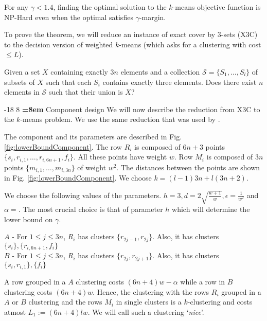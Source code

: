 \documentclass[orivec]{llncs}
\makeatletter
\newcommand{\mc}{\mathcal}
\renewcommand\subsubsection{\@startsection{subsubsection}{3}{\z@}%
   {-18\p@ \@plus -4\p@ \@minus -4\p@}%
   {8\p@ \@plus 4\p@ \@minus 4\p@}%
   {\normalfont\normalsize\bfseries\boldmath
   \rightskip=\z@ \@plus 8em \pretolerance=10000}}
\makeatother
\begin{document}
\begin{theorem}
For any $\gamma < 1.4$, finding the optimal solution to the $k$-means objective function is NP-Hard even when the optimal satisfies $\gamma$-margin.
\end{theorem}
To prove the theorem, we will reduce an instance of exact cover by 3-sets (X3C) to the decision version of weighted $k$-means (which asks for a clustering with cost $\le L$).
\begin{definition}[X3C]
Given a set $X$ containing exactly $3n$ elements and a collection $\mc S = \{S_1, \ldots, S_l\}$ of subsets of $X$ such that each $S_i$ contains exactly three elements. Does there exist $n$ elements in $\mc S$ such that their union is $X$? 
\end{definition}

\subsubsection{Component design}
We will now describe the reduction from X3C to the $k$-means problem. We use the same reduction that was used by \cite{vattani2009hardness}. 

The component and its parameters are described in Fig. \ref{fig:lowerBoundComponent}. The row $R_i$ is composed of $6n + 3$ points $\{s_i, r_{i, 1}, \ldots, r_{i, 6n+1}, f_i\}$. All these points have weight $w$. Row $M_i$ is composed of $3n$ points $\{m_{i,1}, \ldots, m_{i, 3n}\}$ of weight $w^2$. The distances between the points are shown in Fig. \ref{fig:lowerBoundComponent}. We choose $k = (l-1)3n + l(3n+2)$. 

We choose the following values of the parameters. $h = 3, d = 2\sqrt{\frac{w+1}{w}}, \epsilon = \frac{1}{w^2}$ and $\alpha = .$ The most crucial choice is that of parameter $h$ which will determine the lower bound on $\gamma$.

\begin{definition}

\noindent $A$ - For $1 \le j \le 3n$, $R_i$ has clusters $\{r_{2j-1}, r_{2j}\}$. Also, it has clusters $\{s_i\}, \{r_{i, 6n+1}, f_i\}$\\
\noindent $B$ - For $1 \le j \le 3n$, $R_i$ has clusters $\{r_{2j}, r_{2j+1}\}$. Also, it has clusters $\{s_i, r_{i, 1}\}, \{f_i\}$
\end{definition}
A row grouped in a $A$ clustering costs $(6n+4)w-\alpha$ while a row in $B$ clustering costs $(6n+4)w$. Hence, the clustering with the rows $R_i$ grouped in a $A$ or $B$ clustering and the rows $M_i$ in single clusters is a $k$-clustering and costs atmost $L_1 := (6n+4)lw$. We will call such a clustering `{\it nice}'.
\end{document}

